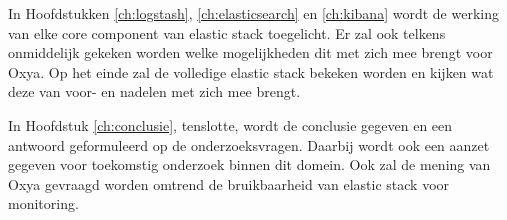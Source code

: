 In Hoofdstukken \ref{ch:logstash}, \ref{ch:elasticsearch} en \ref{ch:kibana} wordt de werking van elke core component van elastic stack toegelicht. Er zal ook telkens onmiddelijk gekeken worden welke mogelijkheden dit met zich mee brengt voor Oxya. Op het einde zal de volledige elastic stack bekeken worden en kijken wat deze van voor- en nadelen met zich mee brengt.


In Hoofdstuk \ref{ch:conclusie}, tenslotte, wordt de conclusie gegeven en een antwoord geformuleerd op de onderzoeksvragen. Daarbij wordt ook een aanzet gegeven voor toekomstig onderzoek binnen dit domein. Ook zal de mening van Oxya gevraagd worden omtrend de bruikbaarheid van elastic stack voor monitoring. 
